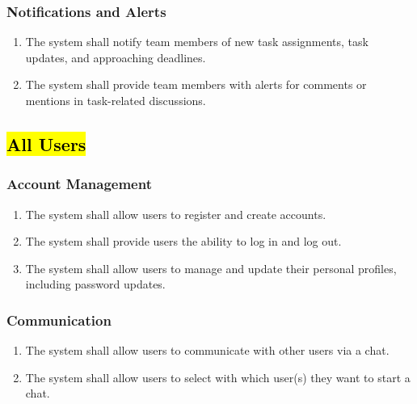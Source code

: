 \documentclass[]{article}
\begin{document}
            \subsubsection{Notifications and Alerts}
            \begin{enumerate}[label=\scriptsize\textbf{\textcolor{gray}{FR-TM-\arabic{tmCounter}}}, leftmargin=*, itemsep=-4px]
                \item The system shall notify team members of new task assignments, task updates, and approaching deadlines.
                \item The system shall provide team members with alerts for comments or mentions in task-related discussions.
            \end{enumerate}

        \subsection{\hl{All Users}}
            \subsubsection{Account Management}
            \begin{enumerate}[label=\scriptsize\textbf{\textcolor{gray}{FR-ALL-\arabic{allCounter}}}, leftmargin=*, itemsep=-4px]
                \item The system shall allow users to register and create accounts.
                \item The system shall provide users the ability to log in and log out.
                \item The system shall allow users to manage and update their personal profiles, including password updates.
            \end{enumerate}

            \subsubsection{Communication}
            \begin{enumerate}[label=\scriptsize\textbf{\textcolor{gray}{FR-ALL-\arabic{allCounter}}}, leftmargin=*, itemsep=-4px]
                \item The system shall allow users to communicate with other users via a chat.
                \item The system shall allow users to select with which user(s) they want to start a chat.
            \end{enumerate}
\end{document}
